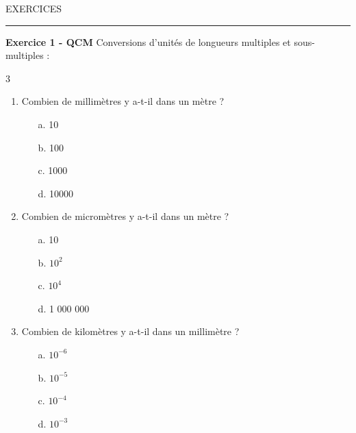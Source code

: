 \documentclass[11pt,a4paper]{article}
\begin{document}
\begin{center}
\LARGE{EXERCICES}
\end{center}




\hrule

\vspace{1cm}

\textbf{Exercice 1 - QCM }
Conversions d'unités de longueurs multiples et sous-multiples :

\begin {multicols}{3}

\begin{enumerate}
\item Combien de millimètres y a-t-il dans un mètre ?
\begin{enumerate}
\item[a.] 10
\item[b.] 100
\item[c.] 1000
\item[d.] 10000
\end{enumerate}
\item Combien de micromètres y a-t-il dans un mètre ?
\begin{enumerate}
\item[a.] 10
\item[b.] $10^2$
\item[c.] $10^4$
\item[d.] 1 000 000
\end{enumerate}
\item Combien de kilomètres y a-t-il dans un millimètre ?
\begin{enumerate}
\item[a.] $10^{-6}$
\item[b.] $10^{-5}$
\item[c.] $10^{-4}$
\item[d.] $10^{-3}$
\end{enumerate}

\columnbreak


\end{enumerate}
\end{multicols}
\end{document}

